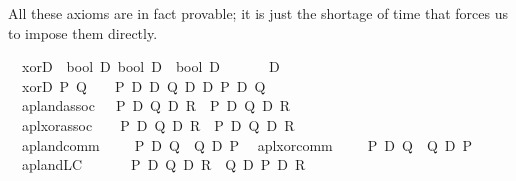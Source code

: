 \begin{isabellebody}
\begin{isamarkuptext}
  All these axioms are in fact provable; it is just the shortage of time that
  forces us to impose them directly.  
  \label{isa:simp-pdl-taut}%
\end{isamarkuptext}%
\isamarkuptrue%
\isanewline
\ \ xorD\ {\isacharcolon}{\isacharcolon}\ {\isachardoublequote}{\isacharbrackleft}bool\ D{\isacharcomma}\ bool\ D{\isacharbrackright}\ {\isasymRightarrow}\ bool\ D{\isachardoublequote}\ \ \ \ \ \ {\isacharparenleft}\ {\isachardoublequote}{\isasymoplus}\isactrlsub D{\isachardoublequote}\ {}{}{\isacharparenright}\isanewline
\ \ {\isachardoublequote}xorD\ P\ Q\ \ {\isasymequiv}\ \ {\isacharparenleft}P\ {\isasymand}\isactrlsub D\ {\isasymnot}\isactrlsub D\ Q{\isacharparenright}\ {\isasymor}\isactrlsub D\ {\isacharparenleft}{\isasymnot}\isactrlsub D\ P\ {\isasymand}\isactrlsub D\ Q{\isacharparenright}{\isachardoublequote}\isanewline
\isanewline
\ \ \isanewline
\isamarkupfalse%
\isanewline
\ \ apl{\isacharunderscore}and{\isacharunderscore}assoc{\isacharcolon}\ \ \ {\isachardoublequote}{\isacharparenleft}{\isacharparenleft}P\ {\isasymand}\isactrlsub D\ Q{\isacharparenright}\ {\isasymand}\isactrlsub D\ R{\isacharparenright}\ {\isacharequal}\ {\isacharparenleft}P\ {\isasymand}\isactrlsub D\ {\isacharparenleft}Q\ {\isasymand}\isactrlsub D\ R{\isacharparenright}{\isacharparenright}{\isachardoublequote}\isanewline
\ \ apl{\isacharunderscore}xor{\isacharunderscore}assoc{\isacharcolon}\ \ \ \ {\isachardoublequote}{\isacharparenleft}{\isacharparenleft}P\ {\isasymoplus}\isactrlsub D\ Q{\isacharparenright}\ {\isasymoplus}\isactrlsub D\ R{\isacharparenright}\ {\isacharequal}\ {\isacharparenleft}P\ {\isasymoplus}\isactrlsub D\ {\isacharparenleft}Q\ {\isasymoplus}\isactrlsub D\ R{\isacharparenright}{\isacharparenright}{\isachardoublequote}\isanewline
\ \ apl{\isacharunderscore}and{\isacharunderscore}comm{\isacharcolon}\ \ \ \ \ {\isachardoublequote}{\isacharparenleft}P\ {\isasymand}\isactrlsub D\ Q{\isacharparenright}\ {\isacharequal}\ {\isacharparenleft}Q\ {\isasymand}\isactrlsub D\ P{\isacharparenright}{\isachardoublequote}\isanewline
\ \ apl{\isacharunderscore}xor{\isacharunderscore}comm{\isacharcolon}\ \ \ \ \ {\isachardoublequote}{\isacharparenleft}P\ {\isasymoplus}\isactrlsub D\ Q{\isacharparenright}\ {\isacharequal}\ {\isacharparenleft}Q\ {\isasymoplus}\isactrlsub D\ P{\isacharparenright}{\isachardoublequote}\isanewline
\ \ apl{\isacharunderscore}and{\isacharunderscore}LC{\isacharcolon}\ \ \ \ \ \ \ {\isachardoublequote}{\isacharparenleft}P\ {\isasymand}\isactrlsub D\ {\isacharparenleft}Q\ {\isasymand}\isactrlsub D\ R{\isacharparenright}{\isacharparenright}\ {\isacharequal}\ {\isacharparenleft}Q\ {\isasymand}\isactrlsub D\ {\isacharparenleft}P\ {\isasymand}\isactrlsub D\ R{\isacharparenright}{\isacharparenright}{\isachardoublequote}\isanewline

\end{isabellebody}
